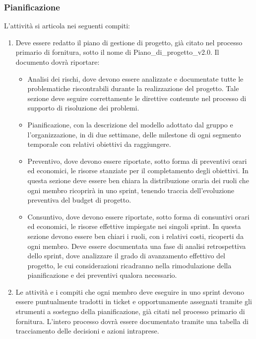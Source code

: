 \subsubsection{Pianificazione}
L'attività si articola nei seguenti compiti:
\begin{enumerate}
    \item Deve essere redatto il piano di gestione di progetto, già citato nel processo primario di fornitura, sotto il nome di Piano\_di\_progetto\_v2.0. Il documento dovrà riportare:
\begin{itemize}
    \item Analisi dei rischi, dove devono essere analizzate e documentate tutte le problematiche riscontrabili durante la realizzazione del progetto. Tale sezione deve seguire correttamente le direttive contenute nel processo di supporto di risoluzione dei problemi.
    \item Pianificazione, con la descrizione del modello adottato dal gruppo e l'organizzazione, in  di due settimane, delle milestone di ogni segmento temporale con relativi obiettivi da raggiungere.
    \item Preventivo, dove devono essere riportate, sotto forma di preventivi orari ed economici, le risorse stanziate per il completamento degli obiettivi. In questa sezione deve essere ben chiara la distribuzione oraria dei ruoli che ogni membro ricoprirà in uno sprint, tenendo traccia dell'evoluzione preventiva del budget di progetto.
    \item Consuntivo, dove devono essere riportate, sotto forma di consuntivi orari ed economici, le risorse effettive impiegate nei singoli sprint. In questa sezione devono essere ben chiari i ruoli, con i relativi costi, ricoperti da ogni membro. Deve essere documentata una fase di analisi retrospettiva dello sprint, dove analizzare il grado di avanzamento effettivo del progetto, le cui considerazioni ricadranno nella rimodulazione della pianificazione e dei preventivi qualora necessario.
\end{itemize}
    \item Le attività e i compiti che ogni membro deve eseguire in uno sprint devono essere puntualmente tradotti in ticket e opportunamente assegnati tramite gli strumenti a sostegno della pianificazione, già citati nel processo primario di fornitura. L'intero processo dovrà essere documentato tramite una tabella di tracciamento delle decisioni e azioni intraprese.
\end{enumerate}


